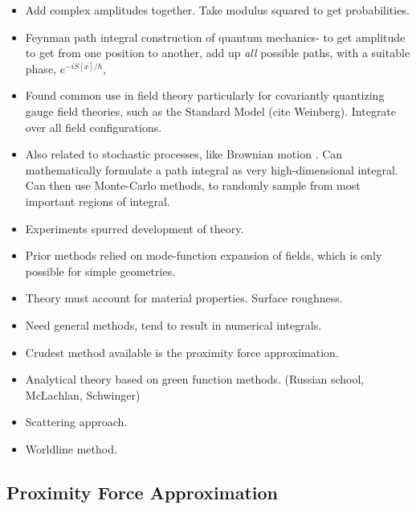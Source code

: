 \begin{itemize}
\item Add complex amplitudes together.  Take modulus squared to get probabilities.  
\item Feynman path integral construction of quantum mechanics- 
to get amplitude to get from one position to another, add up \emph{all} possible paths,
 with a suitable phase, $e^{-i S[x]/\hbar}$, \cite{Feynman1942, Feynman1965}
\item Found common use in field theory particularly for covariantly quantizing gauge field theories,
 such as the Standard Model (cite Weinberg).  Integrate over all field configurations.  
\item  Also related to stochastic processes, like Brownian motion \cite{Karatzas1991}.
   Can mathematically formulate a path integral as very high-dimensional integral.
  Can then use Monte-Carlo methods, to randomly sample from most important regions of integral.  
\end{itemize}



\begin{itemize}
\item Experiments spurred development of theory.  
\item Prior methods relied on mode-function expansion of fields, which is only possible
for simple geometries.  
\item Theory must account for material properties.  Surface roughness.  
\item Need general methods, tend to result in numerical integrals.
\item Crudest method available is the proximity force approximation.  
\item Analytical theory based on green function methods.  (Russian school, McLachlan, Schwinger)
\item Scattering approach.  
\item Worldline method.  
\end{itemize}

\subsection{Proximity Force Approximation}

